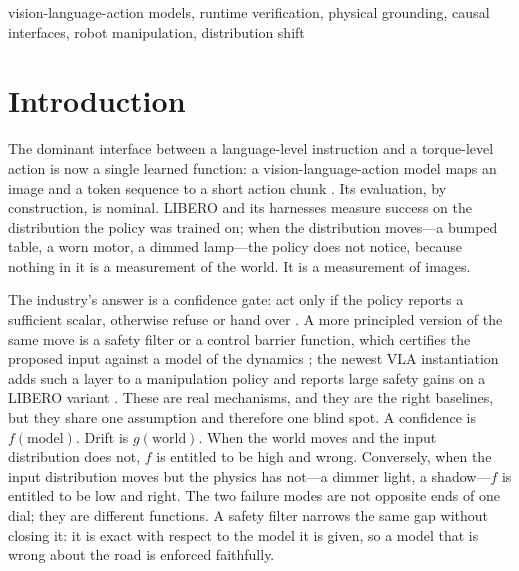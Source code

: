 \documentclass[conference]{IEEEtran}
\theoremstyle{definition}
\begin{document}
\begin{abstract}
We also report a defect in our own first implementation: the gate was a
set-membership
test over all previously registered digests, so a scene that \emph{regressed}
to an earlier state was accepted as evidence that the action had worked. Three
episodes passed every witness check with the manipulated object 245--269\,mm
from its target. A hash binds content; causation is a relation between a
prediction and a particular attempt. Binding a monotonic ordinal into every
registration closes the replay, and we argue this is a general requirement for
any physical witness, not a bug fix.
\end{abstract}

\begin{IEEEkeywords}
vision-language-action models, runtime verification, physical grounding,
causal interfaces, robot manipulation, distribution shift
\end{IEEEkeywords}

\section{Introduction}

The dominant interface between a language-level instruction and a torque-level
action is now a single learned function: a vision-language-action model maps an
image and a token sequence to a short action chunk \cite{brohan2023rt2,
kim2024openvla, black2024pi0}. Its evaluation, by construction, is nominal.
LIBERO \cite{liu2023libero} and its harnesses measure success on the
distribution the policy was trained on; when the distribution moves---a bumped
table, a worn motor, a dimmed lamp---the policy does not notice, because
nothing in it is a measurement of the world. It is a measurement of images.

The industry's answer is a confidence gate: act only if the policy reports a
sufficient scalar, otherwise refuse or hand over
\cite{alshiekh2018shielding, zhang2025safevla}. A more principled version of the
same move is a safety filter or a control barrier function, which certifies the
proposed input against a model of the dynamics
\cite{wabersich2021safetyfilter, ames2019cbf}; the newest VLA instantiation
adds such a layer to a manipulation policy and reports large safety gains on a
LIBERO variant \cite{hu2025vlsa}. These are real mechanisms, and they are the
right baselines, but they share one assumption and therefore one blind spot.
A confidence is $f(\text{model})$. Drift is $g(\text{world})$. When the world
moves and the input distribution does not, $f$ is entitled to be high and wrong.
Conversely, when the input distribution moves but the physics has not---a dimmer
light, a shadow---$f$ is entitled to be low and right. The two failure modes are
not opposite ends of one dial; they are different functions. A safety filter
narrows the same gap without closing it: it is exact with respect to the model
it is given, so a model that is wrong about the road is enforced faithfully.
\end{document}

